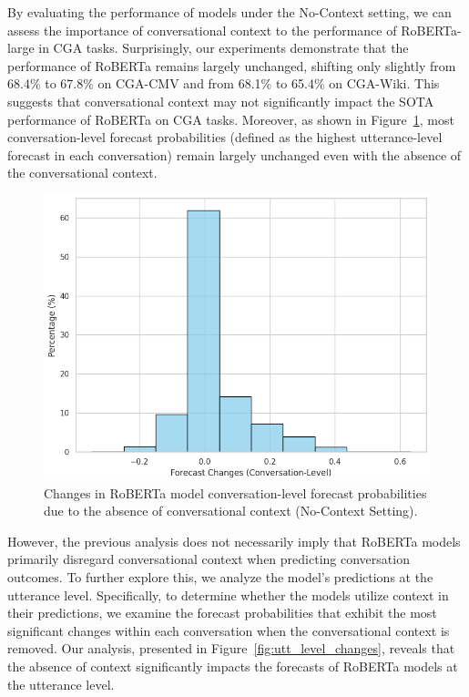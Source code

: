 %
By evaluating the performance of models under the No-Context setting, we can assess the importance of conversational context to the performance of RoBERTa-large in CGA tasks. 
%
Surprisingly, our experiments demonstrate that the performance of RoBERTa remains largely unchanged, shifting only slightly from 68.4\% to 67.8\% on CGA-CMV and from 68.1\% to 65.4\% on CGA-Wiki. 
%
This suggests that conversational context may not significantly impact the SOTA performance of RoBERTa on CGA tasks.
%
Moreover, as shown in Figure~\ref{fig:convo_level_changes}, most conversation-level forecast probabilities (defined as the highest utterance-level forecast in each conversation) remain largely unchanged even with the absence of the conversational context.

\begin{figure}[t]
    \centering
    \includegraphics[width=\linewidth]{figures/convo_level_changes.png}
    \caption{
        Changes in RoBERTa model conversation-level forecast probabilities due to the absence of conversational context (No-Context Setting).}
    \label{fig:convo_level_changes}
\end{figure}

However, the previous analysis does not necessarily imply that RoBERTa models primarily disregard conversational context when predicting conversation outcomes. 
%
To further explore this, we analyze the model's predictions at the utterance level. 
%
Specifically, to determine whether the models utilize context in their predictions, we examine the forecast probabilities that exhibit the most significant changes within each conversation when the conversational context is removed. 
%
Our analysis, presented in Figure~\ref{fig:utt_level_changes}, reveals that the absence of context significantly impacts the forecasts of RoBERTa models at the utterance level.

